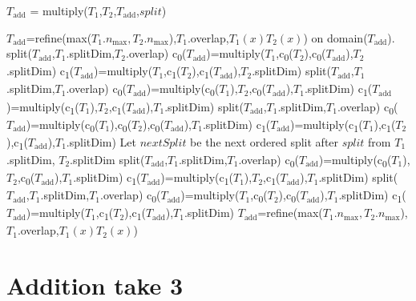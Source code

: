 \documentclass{article}
\newcommand{\nmax}{n_{\text{max}}}
\newcommand{\child}[1]{c\textsubscript{#1}}
\begin{document}
\begin{algorithm}[!h]
\caption{$T_{\mbox{add}}$ = multiply($T_1$,$T_2$,$T_{\mbox{add}}$,$split$)}
\label{addition2}
\begin{algorithmic}
\STATE $T_{\mbox{add}}$=refine(max($T_1.\nmax,T_2.\nmax$),$T_1$.overlap,$T_1(x)T_2(x)$) on domain($T_{\mbox{add}}$).
\STATE split($T_{\mbox{add}}$,$T_1$.splitDim,$T_2$.overlap)
\STATE \child{0}($T_{\mbox{add}}$)=multiply($T_1$,\child{0}($T_2$),\child{0}($T_{\mbox{add}}$),$T_2$.splitDim)
\STATE \child{1}($T_{\mbox{add}}$)=multiply($T_1$,\child{1}($T_2$),\child{1}($T_{\mbox{add}}$),$T_2$.splitDim)
\STATE split($T_{\mbox{add}}$,$T_1$.splitDim,$T_1$.overlap)
\STATE \child{0}($T_{\mbox{add}}$)=multiply(\child{0}($T_1$),$T_2$,\child{0}($T_{\mbox{add}}$),$T_1$.splitDim)
\STATE \child{1}($T_{\mbox{add}}$)=multiply(\child{1}($T_1$),$T_2$,\child{1}($T_{\mbox{add}}$),$T_1$.splitDim)
\STATE split($T_{\mbox{add}}$,$T_1$.splitDim,$T_1$.overlap)
\STATE \child{0}($T_{\mbox{add}}$)=multiply(\child{0}($T_1$),\child{0}($T_2$),\child{0}($T_{\mbox{add}}$),$T_1$.splitDim)
\STATE \child{1}($T_{\mbox{add}}$)=multiply(\child{1}($T_1$),\child{1}($T_2$),\child{1}($T_{\mbox{add}}$),$T_1$.splitDim)
\ELSE
\STATE Let $nextSplit$ be the next ordered split after $split$ from $T_1$.splitDim, $T_2$.splitDim
\STATE split($T_{\mbox{add}}$,$T_1$.splitDim,$T_1$.overlap)
\STATE \child{0}($T_{\mbox{add}}$)=multiply(\child{0}($T_1$),$T_2$,\child{0}($T_{\mbox{add}}$),$T_1$.splitDim)
\STATE \child{1}($T_{\mbox{add}}$)=multiply(\child{1}($T_1$),$T_2$,\child{1}($T_{\mbox{add}}$),$T_1$.splitDim)
\STATE split($T_{\mbox{add}}$,$T_1$.splitDim,$T_1$.overlap)
\STATE \child{0}($T_{\mbox{add}}$)=multiply($T_1$,\child{0}($T_2$),\child{0}($T_{\mbox{add}}$),$T_1$.splitDim)
\STATE \child{1}($T_{\mbox{add}}$)=multiply($T_1$,\child{1}($T_2$),\child{1}($T_{\mbox{add}}$),$T_1$.splitDim)
\ELSE
\STATE $T_{\mbox{add}}$=refine(max($T_1.\nmax,T_2.\nmax$),$T_1$.overlap,$T_1(x)T_2(x)$)
\ENDIF
\ENDIF
\end{algorithmic}
\end{algorithm}

\section{Addition take 3}
\end{document}

